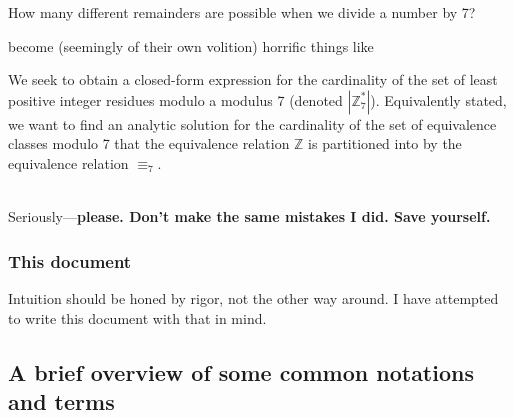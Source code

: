\documentclass[10pt]{article}
\newcommand\ZZ{{\mathbb Z}}
\theoremstyle{definition}
\begin{document}
\begin{center}
How many different remainders are possible when we divide a number by 7?
\end{center}
become (seemingly of their own volition) horrific things like \\
\begin{adjustwidth}{.05\linewidth}{}
We seek to obtain a closed-form expression for the cardinality of the set of least positive integer residues modulo a modulus 7 (denoted $|\ZZ_7^*|$).  Equivalently stated, we want to find an analytic solution for the cardinality of the set of equivalence classes modulo 7 that the equivalence relation $\ZZ$ is partitioned into by the equivalence relation $\equiv_7$.
\end{adjustwidth}~\\
Seriously---\textbf{please.  Don't make the same mistakes I did.  Save yourself.}
\subsubsection{This document}
Intuition should be honed by rigor, not the other way around.  I have attempted to write this document with that in mind.
\subsection{A brief overview of some common notations and terms}
\end{document}
